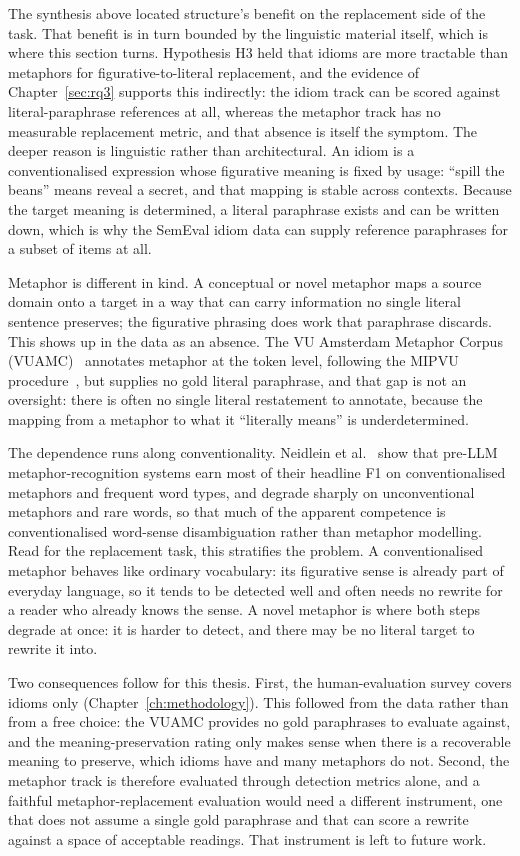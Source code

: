 The synthesis above located structure's benefit on the replacement side of the task. That benefit is in turn bounded by the linguistic material itself, which is where this section turns. Hypothesis H3 held that idioms are more tractable than metaphors for figurative-to-literal replacement, and the evidence of Chapter~\ref{sec:rq3} supports this indirectly: the idiom track can be scored against literal-paraphrase references at all, whereas the metaphor track has no measurable replacement metric, and that absence is itself the symptom. The deeper reason is linguistic rather than architectural. An idiom is a conventionalised expression whose figurative meaning is fixed by usage: ``spill the beans'' means reveal a secret, and that mapping is stable across contexts. Because the target meaning is determined, a literal paraphrase exists and can be written down, which is why the SemEval idiom data can supply reference paraphrases for a subset of items at all.

Metaphor is different in kind. A conceptual or novel metaphor maps a source domain onto a target in a way that can carry information no single literal sentence preserves; the figurative phrasing does work that paraphrase discards. This shows up in the data as an absence. The VU Amsterdam Metaphor Corpus (VUAMC)~\cite{vuamsterdammetaphorcorpus} annotates metaphor at the token level, following the MIPVU procedure~\cite{mipvu}, but supplies no gold literal paraphrase, and that gap is not an oversight: there is often no single literal restatement to annotate, because the mapping from a metaphor to what it ``literally means'' is underdetermined.

The dependence runs along conventionality. Neidlein et al.~\cite{Neidlein2020} show that pre-LLM metaphor-recognition systems earn most of their headline F1 on conventionalised metaphors and frequent word types, and degrade sharply on unconventional metaphors and rare words, so that much of the apparent competence is conventionalised word-sense disambiguation rather than metaphor modelling. Read for the replacement task, this stratifies the problem. A conventionalised metaphor behaves like ordinary vocabulary: its figurative sense is already part of everyday language, so it tends to be detected well and often needs no rewrite for a reader who already knows the sense. A novel metaphor is where both steps degrade at once: it is harder to detect, and there may be no literal target to rewrite it into.

Two consequences follow for this thesis. First, the human-evaluation survey covers idioms only (Chapter~\ref{ch:methodology}). This followed from the data rather than from a free choice: the VUAMC provides no gold paraphrases to evaluate against, and the meaning-preservation rating only makes sense when there is a recoverable meaning to preserve, which idioms have and many metaphors do not. Second, the metaphor track is therefore evaluated through detection metrics alone, and a faithful metaphor-replacement evaluation would need a different instrument, one that does not assume a single gold paraphrase and that can score a rewrite against a space of acceptable readings. That instrument is left to future work.

